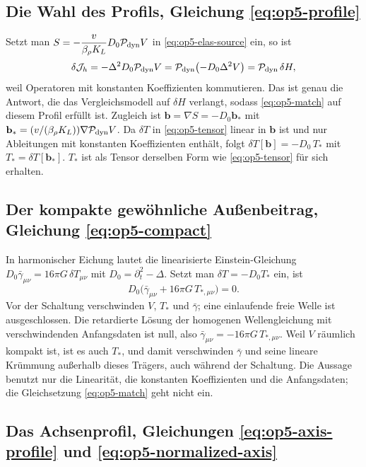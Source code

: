 \subsection{Die Wahl des Profils, Gleichung \eqref{eq:op5-profile}}
\label{sec:anhang-b-profil}

Setzt man \(S=-\dfrac{v}{\beta_\rho K_L}D_0\mathcal P_{\rm dyn}V\) in \eqref{eq:op5-elas-source} ein, so ist
\[
 \delta\mathcal J_h=-\Delta^2D_0\mathcal P_{\rm dyn}V=\mathcal P_{\rm dyn}\bigl(-D_0\Delta^2V\bigr)=\mathcal P_{\rm dyn}\,\delta H ,
\]
weil Operatoren mit konstanten Koeffizienten kommutieren. Das ist genau die Antwort, die das Vergleichsmodell auf \(\delta H\) verlangt,
sodass \eqref{eq:op5-match} auf diesem Profil erfüllt ist. Zugleich ist \(\mathbf b=\nabla S=-D_0\mathbf b_*\) mit
\(\mathbf b_*=(v/(\beta_\rho K_L))\nabla\mathcal P_{\rm dyn}V\). Da \(\delta T\) in \eqref{eq:op5-tensor} linear in \(\mathbf b\) ist und nur
Ableitungen mit konstanten Koeffizienten enthält, folgt \(\delta T[\mathbf b]=-D_0\,T_*\) mit \(T_*=\delta T[\mathbf b_*]\). \(T_*\) ist als Tensor
derselben Form wie \eqref{eq:op5-tensor} für sich erhalten.

\subsection{Der kompakte gewöhnliche Außenbeitrag, Gleichung \eqref{eq:op5-compact}}
\label{sec:anhang-b-kompakt}

In harmonischer Eichung lautet die linearisierte Einstein-Gleichung \(D_0\bar\gamma_{\mu\nu}=16\pi G\,\delta T_{\mu\nu}\) mit
\(D_0=\partial_t^2-\Delta\). Setzt man \(\delta T=-D_0T_*\) ein, ist
\[
 D_0\bigl(\bar\gamma_{\mu\nu}+16\pi G\,T_{*,\mu\nu}\bigr)=0 .
\]
Vor der Schaltung verschwinden \(V\), \(T_*\) und \(\bar\gamma\); eine einlaufende freie Welle ist ausgeschlossen. Die retardierte Lösung der
homogenen Wellengleichung mit verschwindenden Anfangsdaten ist null, also \(\bar\gamma_{\mu\nu}=-16\pi G\,T_{*,\mu\nu}\). Weil \(V\) räumlich
kompakt ist, ist es auch \(T_*\), und damit verschwinden \(\bar\gamma\) und seine lineare Krümmung außerhalb dieses Trägers, auch
während der Schaltung. Die Aussage benutzt nur die Linearität, die konstanten Koeffizienten und die Anfangsdaten; die Gleichsetzung
\eqref{eq:op5-match} geht nicht ein.

\subsection{Das Achsenprofil, Gleichungen \eqref{eq:op5-axis-profile} und \eqref{eq:op5-normalized-axis}}
\label{sec:anhang-b-achse}

